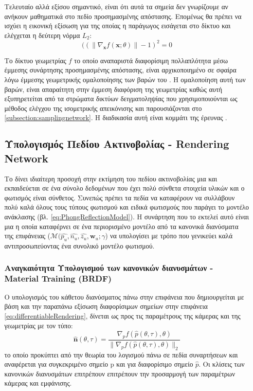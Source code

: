     Τελευταίο αλλά εξίσου σημαντικό, είναι ότι αυτά τα σημεία δεν γνωρίζουμε αν ανήκουν μαθηματικά στο πεδίο προσημασμένης απόστασης. Επομένως θα πρέπει να ισχύει η εικονική εξίσωση για της οποίας η παράγωγος εισάγεται στο δίκτυο και ελέγχεται η δεύτερη νόρμα $L_2$:
         $$(\left(\left\|\nabla_{\boldsymbol{x}} f(\boldsymbol{x} ; \theta)\right\|-1\right)^2 = 0$$
\par
    Το δίκτυο γεωμετρίας $f$ το οποίο αναπαριστά διαφορίσιμη πολλαπλότητα μέσω έμμεσης συνάρτησης προσημασμένης απόστασης, είναι αρχικοποιημένο σε σφαίρα λόγω έμμεσης γεωμετρικής ομαλοποίησης των βαρών του . Η ομαλοποίηση αυτή των βαρών, είναι απαραίτητη στην έμμεση διαφόριση της γεωμετρίας καθώς αυτή εξυπηρετείται από τα στρώματα δικτύων δειγματοληψίας που χρησιμοποιούνται ως μέθοδος ελέγχου της ισομετρικής απεικόνισης και παρουσιάζονται στο \ref{subsection:samplingnetwork}. Η διαδικασία αυτή είναι κομμάτι της έρευνας \cite{DBLP:journals/corr/abs-1905-11911}.
        
        
    

    
\subsection{Υπολογισμός Πεδίου Ακτινοβολίας  - Rendering Network }
\par
    Το  \cite{yariv2020multiview} δίνει ιδιαίτερη προσοχή στην εκτίμηση του πεδίου ακτινοβολίας μια και εκπαιδεύεται σε ένα σύνολο δεδομένων που έχει πολύ σύνθετα στοιχεία υλικών και ο φωτισμός είναι σύνθετος. Συνεπώς πρέπει τα πεδία να καταφέρουν να συλλάβουν πολύ καλά όλους τους τύπους φωτισμού και ειδικά φωτισμούς που παράγει το μοντέλο ανάκλασης  (βλ. \ref{eq:PhongReflectionModel}). Η συνάρτηση που το εκτελεί αυτό είναι μια  η οποία καταφέρνει σε ένα περιορισμένο μοντέλο από τα κανονικά διανύσματα της επιφάνειας ($\mathcal{M}(\hat{p_u}, \hat{n_u}, \hat{z_u}, \boldsymbol{w}_u;\gamma$) να υπολογίσει με τρόπο που γενικεύει καλά αντιπροσωπεύοντας ένα συνολικό μοντέλο φωτισμού.

    
\subsubsection{Αναγκαιότητα Υπολογισμού των κανονικών διανυσμάτων - Material Training (BRDF)}
    O υπολογισμός του κάθετου διανύσματος πάνω στην επιφάνεια που δημιουργείται με βάση και την παραπάνω εξίσωση διαφορίσιμων σημείων στην επιφάνεια \ref{eq:differentiableRendering}, δίνεται ως προς τις παραμέτρους της κάμερας και της γεωμετρίας με τον τύπο:
    \begin{equation}
        \boldsymbol{\hat{n}}(\theta, \tau) = \frac{\nabla_{p}f(\hat{p}(\theta, \tau), \theta)}{\|\nabla_{p}f(\hat{p}(\theta, \tau), \theta)\|_{2}}
        \label{eq:normalOnSdf}
    \end{equation}
    το οποίο προκύπτει από την θεωρία του λογισμού πάνω σε πεδία συναρτήσεων και αναφέρεται για συγκεκριμένο σημείο p και για διαφορίσιμο σημείο $\hat{p}$. Οι κλίσεις των κανονικών διανυσμάτων επιτρέπουν επιτρέπουν την προσαρμογή των παραμέτρων κάμερας και εμφάνισης.


